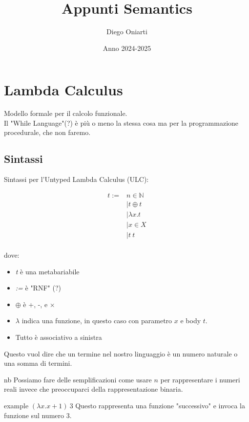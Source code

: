 \documentclass{article}
\title{Appunti Semantics}
\author{Diego Oniarti}
\date{Anno 2024-2025}
\begin{document}
\maketitle
\tableofcontents

\section{Lambda Calculus}
Modello formale per il calcolo funzionale. \\
Il "While Language"(?) è più o meno la stessa cosa ma per la programmazione procedurale, che non faremo.

\subsection{Sintassi}
Sintassi per l'Untyped Lambda Calculus (ULC):

\begin{align*}
t :=  & n\in \mathbb{N} \\
      & | t \oplus t \\
	  & | \lambda x. t \\
	  & | x\in X \\
	  & | t\ t \\
\end{align*}

dove:
\begin{itemize}
    \item \textit{t} è una metabariabile
    \item \textit{:=} è "RNF" (?)
    \item $\oplus$ è +, -, e $\times$
    \item $\lambda$ indica una funzione, in questo caso con parametro $x$ e body $t$.
    \item Tutto è associativo a sinistra
\end{itemize}

Questo vuol dire che un termine nel nostro linguaggio è un numero naturale o una somma di termini.

\begin{callout}{nb}
    Possiamo fare delle semplificazioni come usare $n$ per rappresentare i numeri reali invece che preoccuparci della rappresentazione binaria.
\end{callout}

\begin{esempio}{example}
    $(\lambda x.x+1)\ 3$
    Questo rappresenta una funzione "successivo" e invoca la funzione sul numero $3$.
\end{esempio}
\end{document}
